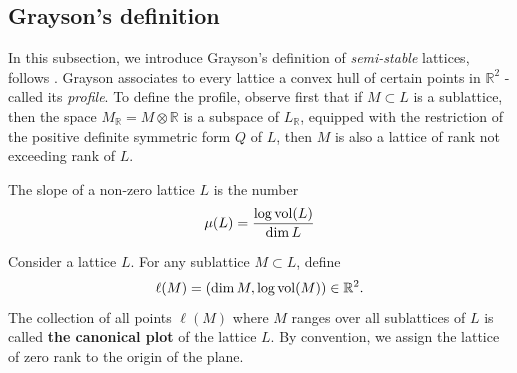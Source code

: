 \subsection{Grayson's definition}
In this subsection, we introduce Grayson's definition of \textit{semi-stable} lattices, follows \cite{MR780079}.
Grayson associates to every lattice a convex hull of certain points in $\mathbb{R}^2$ - called its \textit{ profile}.
To define the profile, observe first that if $M \subset L$ is a sublattice, then the space $M_\mathbb{R} = M \otimes \mathbb{R}$
is a subspace of $L_\mathbb{R}$, equipped with the restriction of the positive definite symmetric form $Q$ of $L$, then $M$
is also a lattice of rank not exceeding rank of $L$.
\begin{definition}[\label = slope]
    The slope of a non-zero lattice $L$ is the number
    \[\mu(L) = \dfrac{\log\operatorname{vol}(L)}{\dim L}\]
\end{definition}
\begin{definition}
    Consider a lattice $L$. For any sublattice $M \subset L$, define
    \[\ell(M) = \left(\dim M, \log\operatorname{vol}(M)\right) \in \mathbb{R}^2.\]
    The collection of all points $\ell(M)$ where $M$ ranges over
    all sublattices of $L$ is called \textbf{ the canonical plot} of the lattice $L$. By convention, we assign
    the lattice of zero rank to the origin of the plane.
\end{definition}


